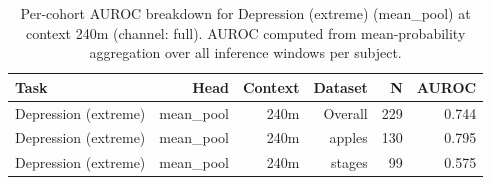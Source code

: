 \begin{table}[ht]
\centering
\caption{Per-cohort AUROC breakdown for Depression (extreme) (mean_pool) at context 240m (channel: full). AUROC computed from mean-probability aggregation over all inference windows per subject.}
\label{tab:cohort_depression_extreme_binary_mean_pool_full}
\begin{tabular}{lrrrrr}
\toprule
Task & Head & Context & Dataset & N & AUROC \\
\midrule
Depression (extreme) & mean_pool & 240m & Overall & 229 & 0.744 \\
Depression (extreme) & mean_pool & 240m & apples & 130 & 0.795 \\
Depression (extreme) & mean_pool & 240m & stages & 99 & 0.575 \\
\bottomrule
\end{tabular}
\end{table}